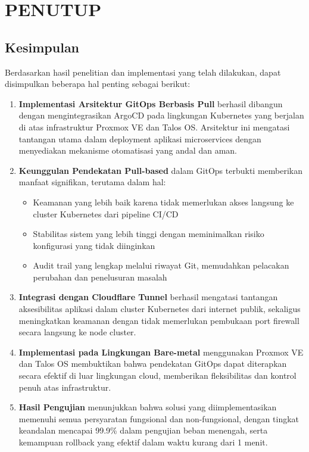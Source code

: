 \chapter{PENUTUP}

\section{Kesimpulan}

Berdasarkan hasil penelitian dan implementasi yang telah dilakukan, dapat disimpulkan beberapa hal penting sebagai berikut:

\begin{enumerate}
    \item \textbf{Implementasi Arsitektur GitOps Berbasis Pull} berhasil dibangun dengan mengintegrasikan ArgoCD pada lingkungan Kubernetes yang berjalan di atas infrastruktur Proxmox VE dan Talos OS. Arsitektur ini mengatasi tantangan utama dalam deployment aplikasi microservices dengan menyediakan mekanisme otomatisasi yang andal dan aman.
    
    \item \textbf{Keunggulan Pendekatan Pull-based} dalam GitOps terbukti memberikan manfaat signifikan, terutama dalam hal:
    \begin{itemize}
        \item Keamanan yang lebih baik karena tidak memerlukan akses langsung ke cluster Kubernetes dari pipeline CI/CD
        \item Stabilitas sistem yang lebih tinggi dengan meminimalkan risiko konfigurasi yang tidak diinginkan
        \item Audit trail yang lengkap melalui riwayat Git, memudahkan pelacakan perubahan dan penelusuran masalah
    \end{itemize}
    
    \item \textbf{Integrasi dengan Cloudflare Tunnel} berhasil mengatasi tantangan aksesibilitas aplikasi dalam cluster Kubernetes dari internet publik, sekaligus meningkatkan keamanan dengan tidak memerlukan pembukaan port firewall secara langsung ke node cluster.
    
    \item \textbf{Implementasi pada Lingkungan Bare-metal} menggunakan Proxmox VE dan Talos OS membuktikan bahwa pendekatan GitOps dapat diterapkan secara efektif di luar lingkungan cloud, memberikan fleksibilitas dan kontrol penuh atas infrastruktur.
    
    \item \textbf{Hasil Pengujian} menunjukkan bahwa solusi yang diimplementasikan memenuhi semua persyaratan fungsional dan non-fungsional, dengan tingkat keandalan mencapai 99.9\% dalam pengujian beban menengah, serta kemampuan rollback yang efektif dalam waktu kurang dari 1 menit.
\end{enumerate}

